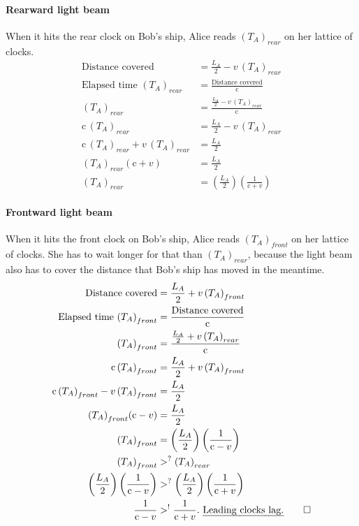 \documentclass[pagesize,headsepline,10pt,parskip=half]{scrreprt}
\newcommand{\const}[1]{\ensuremath{\mathrm{#1}}}
\renewcommand{\c}{\const{c}}
\begin{document}
        \paragraph{Rearward light beam}
          When it hits the rear clock on Bob's ship, Alice
          reads ${(T_A)}_{rear}$ on her lattice of clocks.
          \begin{align*}
            \text{Distance covered} &= \frac{L_A}{2} - v \, {(T_A)}_{rear}\\
            \text{Elapsed time } {(T_A)}_{rear} &= \frac{\text{Distance covered}}{\c}\\
            {(T_A)}_{rear} &= \frac{\frac{L_A}{2} - v \, {(T_A)}_{rear}}{\c}\\
            \c \, {(T_A)}_{rear} &= \frac{L_A}{2} - v \, {(T_A)}_{rear}\\
            \c \, {(T_A)}_{rear} + v \, {(T_A)}_{rear} &= \frac{L_A}{2}\\
            {(T_A)}_{rear} (\c + v) &= \frac{L_A}{2}\\
            {(T_A)}_{rear} &= \left(\frac{L_A}{2}\right)\left(\frac{1}{\c + v}\right)
          \end{align*}

        \paragraph{Frontward light beam}
          When it hits the front clock on Bob's ship, Alice
          reads ${(T_A)}_{front}$ on her lattice of clocks. She has to wait
          longer for that than ${(T_A)}_{rear}$, because the light beam also
          has to cover the distance that Bob's ship has moved in the meantime.
          \begin{align*}
            \text{Distance covered} &= \frac{L_A}{2} + v \, {(T_A)}_{front} \\
            \text{Elapsed time } {(T_A)}_{front} &= \frac{\text{Distance covered}}{\c}\\
            {(T_A)}_{front} &= \frac{\frac{L_A}{2} + v \, {(T_A)}_{rear}}{\c}\\
            \c \, {(T_A)}_{front} &= \frac{L_A}{2} + v \, {(T_A)}_{front}\\
            \c \, {(T_A)}_{front} - v \, {(T_A)}_{front} &= \frac{L_A}{2}\\
            {(T_A)}_{front} (\c - v) &= \frac{L_A}{2}\\
            {(T_A)}_{front} &= \left(\frac{L_A}{2}\right)\left(\frac{1}{\c - v}\right)\\
            {(T_A)}_{front} &>^? {(T_A)}_{rear}\\
            \left(\frac{L_A}{2}\right)\left(\frac{1}{\c - v}\right) &>^? \left(\frac{L_A}{2}\right)\left(\frac{1}{\c + v}\right)\\
            \frac{1}{\c - v} &>^! \frac{1}{\c + v}. \text{ \emph{Leading clocks lag.}} \qed
          \end{align*}
\end{document}
